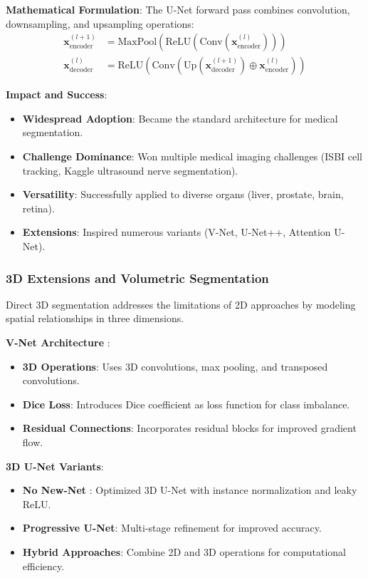 \documentclass[12pt,a4paper]{article}
\begin{document}
\textbf{Mathematical Formulation}:
The U-Net forward pass combines convolution, downsampling, and upsampling operations:
\begin{align}
\mathbf{x}^{(l+1)}_{\text{encoder}} &= \text{MaxPool}(\text{ReLU}(\text{Conv}(\mathbf{x}^{(l)}_{\text{encoder}}))) \\
\mathbf{x}^{(l)}_{\text{decoder}} &= \text{ReLU}(\text{Conv}(\text{Up}(\mathbf{x}^{(l+1)}_{\text{decoder}}) \oplus \mathbf{x}^{(l)}_{\text{encoder}}))
\end{align}

\textbf{Impact and Success}:
\begin{itemize}
    \item \textbf{Widespread Adoption}: Became the standard architecture for medical segmentation.
    \item \textbf{Challenge Dominance}: Won multiple medical imaging challenges (ISBI cell tracking, Kaggle ultrasound nerve segmentation).
    \item \textbf{Versatility}: Successfully applied to diverse organs (liver, prostate, brain, retina).
    \item \textbf{Extensions}: Inspired numerous variants (V-Net, U-Net++, Attention U-Net).
\end{itemize}

\subsubsection{3D Extensions and Volumetric Segmentation}

Direct 3D segmentation addresses the limitations of 2D approaches by modeling spatial relationships in three dimensions.

\textbf{V-Net Architecture} \cite{milletari2016vnet}:
\begin{itemize}
    \item \textbf{3D Operations}: Uses 3D convolutions, max pooling, and transposed convolutions.
    \item \textbf{Dice Loss}: Introduces Dice coefficient as loss function for class imbalance.
    \item \textbf{Residual Connections}: Incorporates residual blocks for improved gradient flow.
\end{itemize}

\textbf{3D U-Net Variants}:
\begin{itemize}
    \item \textbf{No New-Net} \cite{wang20183d}: Optimized 3D U-Net with instance normalization and leaky ReLU.
    \item \textbf{Progressive U-Net}: Multi-stage refinement for improved accuracy.
    \item \textbf{Hybrid Approaches}: Combine 2D and 3D operations for computational efficiency.
\end{itemize}
\end{document}
